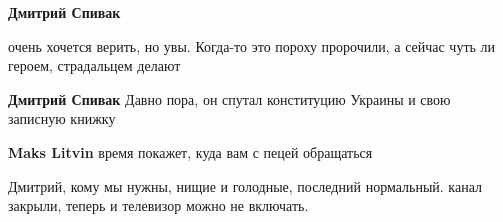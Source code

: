 \begin{itemize}
\begin{itemize}
\textbf{Дмитрий Спивак} 

очень хочется верить, но увы. Когда-то это пороху пророчили, а сейчас чуть ли
героем, страдальцем делают


\textbf{Дмитрий Спивак} Давно пора, он спутал конституцию Украины и свою записную книжку

\textbf{Maks Litvin} время покажет, куда вам с пецей обращаться
\end{itemize} %


Дмитрий, кому мы нужны, нищие и голодные, последний нормальный. канал
закрыли, теперь и телевизор можно не включать.

\end{itemize} %
